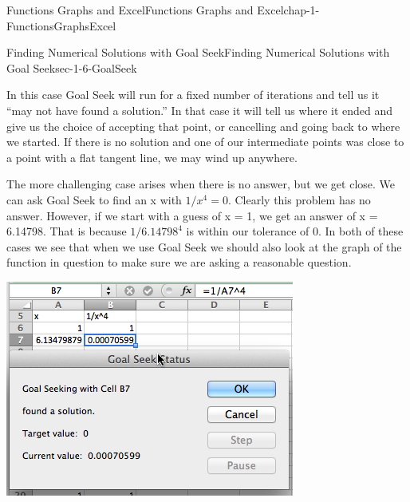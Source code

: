 \documentclass[oneside,10pt,]{book}
\numberwithin{equation}{section}
\begin{document}
\begin{chapterptx}{Functions Graphs and Excel}{}{Functions Graphs and Excel}{}{}{chap-1-FunctionsGraphsExcel}
\begin{sectionptx}{Finding Numerical Solutions with Goal Seek}{}{Finding Numerical Solutions with Goal Seek}{}{}{sec-1-6-GoalSeek}
\begin{sidebyside}{1}{0.1}{0.1}{0}
\begin{sbspanel}{0.8}
\end{sbspanel}%
\end{sidebyside}%
%
\par
\hypertarget{p-497}{}%
In this case Goal Seek will run for a fixed number of iterations and tell us it “may not have found a solution.”  In that case it will tell us where it ended and give us the choice of accepting that point, or cancelling and going back to where we started.  If there is no solution and one of our intermediate points was close to a point with a flat tangent line, we may wind up anywhere.%
\par
\hypertarget{p-498}{}%
The more challenging case arises when there is no answer, but we get close.  We can ask Goal Seek to find an x with \(1/x^4 = 0\).  Clearly this problem has no answer.  However, if we start with a guess of x = 1, we get an answer of x = 6.14798.  That is because \(1/6.14798^4\) is within our tolerance of 0.  In both of these cases we see that when we use Goal Seek we should also look at the graph of the function in question to make sure we are asking a reasonable question. \begin{sidebyside}{1}{0.1}{0.1}{0}%
\begin{sbspanel}{0.8}%
\includegraphics[width=1\linewidth]{images/sec1-6-15.png}
\end{sbspanel}%
\end{sidebyside}%
%
\par
\hypertarget{p-499}{}%

\end{sectionptx}
\end{chapterptx}
\end{document}
